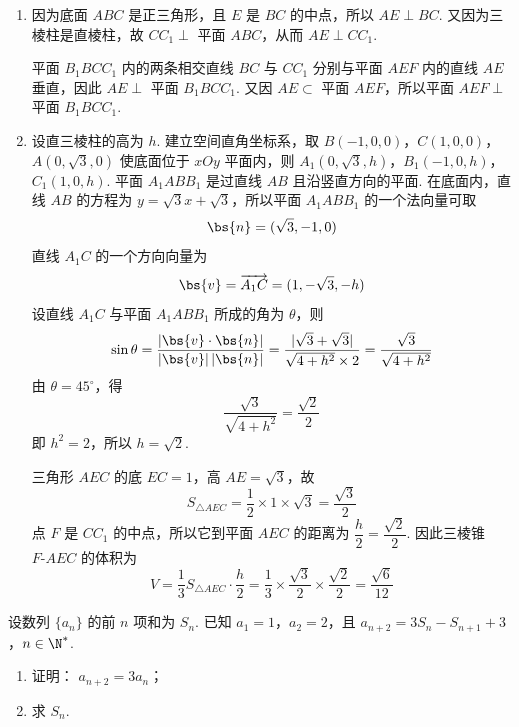 \begin{solution}
\begin{enumerate}
\item 因为底面 \(ABC\) 是正三角形，且 \(E\) 是 \(BC\) 的中点，所以 \(AE\perp BC\). 又因为三棱柱是直棱柱，故 \(CC_{1}\perp\) 平面 \(ABC\)，从而 \(AE\perp CC_{1}\).

平面 \(B_{1}BCC_{1}\) 内的两条相交直线 \(BC\) 与 \(CC_{1}\) 分别与平面 \(AEF\) 内的直线 \(AE\) 垂直，因此 \(AE\perp\) 平面 \(B_{1}BCC_{1}\). 又因 \(AE\subset\) 平面 \(AEF\)，所以平面 \(AEF\perp\) 平面 \(B_{1}BCC_{1}\).

\item 设直三棱柱的高为 \(h\). 建立空间直角坐标系，取
\(B(-1,0,0)\)，\(C(1,0,0)\)，\(A(0,\sqrt{3},0)\)
使底面位于 \(xOy\) 平面内，则
\(A_{1}(0,\sqrt{3},h)\)，\(B_{1}(-1,0,h)\)，\(C_{1}(1,0,h)\).
平面 \(A_{1}ABB_{1}\) 是过直线 \(AB\) 且沿竖直方向的平面. 在底面内，直线 \(AB\) 的方程为 \(y=\sqrt{3}x+\sqrt{3}\)，所以平面 \(A_{1}ABB_{1}\) 的一个法向量可取
\[
\bs{n}=(\sqrt{3},-1,0)
\]
直线 \(A_{1}C\) 的一个方向向量为
\[
\bs{v}=\overrightarrow{A_{1}C}=(1,-\sqrt{3},-h)
\]
设直线 \(A_{1}C\) 与平面 \(A_{1}ABB_{1}\) 所成的角为 \(\theta\)，则
\[
\sin\theta=\frac{|\bs{v}\cdot\bs{n}|}{|\bs{v}|\,|\bs{n}|}
 =\frac{|\sqrt{3}+\sqrt{3}|}{\sqrt{4+h^{2}}\times2}
 =\frac{\sqrt{3}}{\sqrt{4+h^{2}}}
\]
由 \(\theta=45^{\circ}\)，得
\[
\frac{\sqrt{3}}{\sqrt{4+h^{2}}}=\frac{\sqrt{2}}{2}
\]
即 \(h^{2}=2\)，所以 \(h=\sqrt{2}\).

三角形 \(AEC\) 的底 \(EC=1\)，高 \(AE=\sqrt{3}\)，故
\[
S_{\triangle AEC}=\frac{1}{2}\times1\times\sqrt{3}=\frac{\sqrt{3}}{2}
\]
点 \(F\) 是 \(CC_{1}\) 的中点，所以它到平面 \(AEC\) 的距离为 \(\dfrac{h}{2}=\dfrac{\sqrt{2}}{2}\). 因此三棱锥 \(F\text{-}AEC\) 的体积为
\[
V=\frac{1}{3}S_{\triangle AEC}\cdot\frac{h}{2}
 =\frac{1}{3}\times\frac{\sqrt{3}}{2}\times\frac{\sqrt{2}}{2}
 =\frac{\sqrt{6}}{12}
\]
\end{enumerate}
\end{solution}

\begin{problem}
设数列 \(\{a_n\}\) 的前 \(n\) 项和为 \(S_{n}\). 已知 \(a_1 = 1\)，\(a_2 = 2\)，且 \(a_{n+2} = 3S_{n} - S_{n+1} + 3\)，\(n \in \N^*\).

\begin{enumerate}
\item 证明： \(a_{n+2} = 3a_n\)；
\item 求 \(S_{n}\).
\end{enumerate}
\end{problem}

